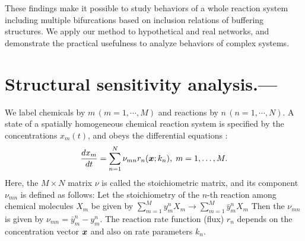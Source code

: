 \documentclass[ amsmath,amssymb,nofootinbib
]{revtex4-1}
\def\mbf#1{\mbox{\boldmath $#1$}}
\newcommand{\bx}{{\mbf x}}
\begin{document}

These findings make it possible to study behaviors of a whole reaction system including multiple bifurcations based on inclusion relations of buffering structures.
We apply our method to {hypothetical and real} networks, and demonstrate the practical usefulness to analyze behaviors of complex systems.


\section{Structural sensitivity analysis.---}We label chemicals by  $m \,(m=1,\cdots,M)$ and reactions by  $n\,(n=1,\cdots,N)$.
A state of a spatially homogeneous chemical reaction system is specified by the concentrations $x_m(t)$,
and obeys the differential equations \cite{Mochizuki,F1,F2}:
\begin{align} \label{e:ode_app}
\frac{d x_m}{dt}= \sum_{n=1}^N \nu_{mn} r_n(\bx;k_n),   \; m=1,\ldots,M.
\end{align}
Here, the $M\times N$ matrix $\nu$ is called the stoichiometric matrix,
and its component $\nu_{mn}$ is defined as follows:
Let the stoichiometry of the $n$-th reaction  among  chemical molecules $X_m$ be given by
$
   \sum_{m=1}^M y^n_m X_m \rightarrow \sum_{m=1}^M \bar{y}^n_m X_m 
$
Then the  $\nu_{mn}$ is given by
$
\nu_{mn}=  \bar{y}^n_m -y^n_m.
$
The reaction rate function (flux) $r_n$ depends on the concentration vector $\bx$ and
also on rate parameters $k_n$.
\end{document}
